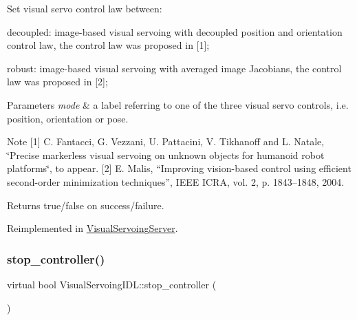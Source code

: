 Set visual servo control law between\+: 


\begin{DoxyEnumerate}
\item \textquotesingle{}decoupled\textquotesingle{}\+: image-\/based visual servoing with decoupled position and orientation control law, the control law was proposed in \mbox{[}1\mbox{]};
\item \textquotesingle{}robust\textquotesingle{}\+: image-\/based visual servoing with averaged image Jacobians, the control law was proposed in \mbox{[}2\mbox{]}; 
\begin{DoxyParams}{Parameters}
{\em mode} & a label referring to one of the three visual servo controls, i.\+e. \textquotesingle{}position\textquotesingle{}, \textquotesingle{}orientation\textquotesingle{} or \textquotesingle{}pose\textquotesingle{}. \\
\hline
\end{DoxyParams}
\begin{DoxyNote}{Note}
\mbox{[}1\mbox{]} C. Fantacci, G. Vezzani, U. Pattacini, V. Tikhanoff and L. Natale, \char`\"{}\+Precise markerless visual servoing on unknown objects for
      humanoid robot platforms\char`\"{}, to appear. \mbox{[}2\mbox{]} E. Malis, “\+Improving vision-\/based control using efficient second-\/order minimization techniques”, I\+E\+EE I\+C\+RA, vol. 2, p. 1843–1848, 2004. 
\end{DoxyNote}
\begin{DoxyReturn}{Returns}
true/false on success/failure. 
\end{DoxyReturn}

\end{DoxyEnumerate}

Reimplemented in \hyperlink{classVisualServoingServer_a2f28e67b1dd44d9afba4a79fd89f4bc8}{Visual\+Servoing\+Server}.

\mbox{\label{classVisualServoingIDL_ac8909c1f4d5eb4cd1ab010fb3dcd7efb}} 
\subsubsection{\texorpdfstring{stop\+\_\+controller()}{stop\_controller()}}
{\footnotesize\ttfamily virtual bool Visual\+Servoing\+I\+D\+L\+::stop\+\_\+controller (\begin{DoxyParamCaption}{ }\end{DoxyParamCaption})\hspace{0.3cm}{\ttfamily [virtual]}}




